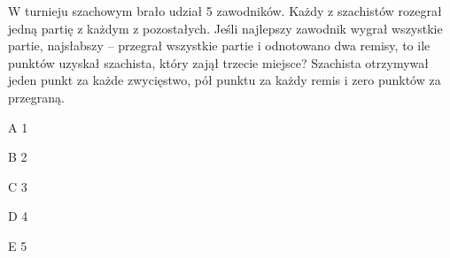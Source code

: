 \begin{tresc}
W turnieju szachowym brało udział 5 zawodników. Każdy z szachistów rozegrał jedną partię z każdym z pozostałych. Jeśli najlepszy zawodnik wygrał wszystkie partie, najsłabszy – przegrał wszystkie partie i odnotowano dwa remisy, to ile punktów uzyskał szachista, który zajął trzecie miejsce? Szachista otrzymywał jeden punkt za każde zwycięstwo, pół punktu za każdy remis i zero punktów za przegraną.
\end{tresc}
\begin{wariant}{A} 1 \end{wariant}
\begin{wariant}{B} 2 \end{wariant}
\begin{wariant}{C} 3 \end{wariant}
\begin{wariant}{D} 4 \end{wariant}
\begin{wariant}{E} 5 \end{wariant}
